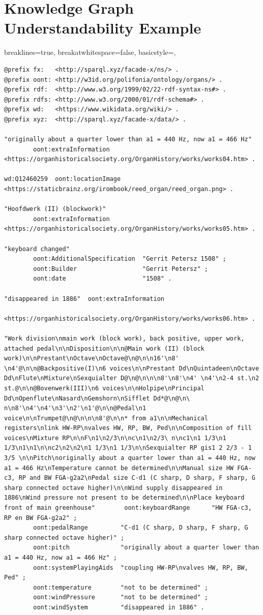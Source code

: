 \section{Knowledge Graph Understandability Example}
\lstset
{
    breaklines=true,
    breakatwhitespace=false,
    basicstyle=\linespread{1}\ttfamily,
}
\begin{lstlisting}[caption={Part01\_001MIDDE}]
@prefix fx:   <http://sparql.xyz/facade-x/ns/> .
@prefix oont: <http://w3id.org/polifonia/ontology/organs/> .
@prefix rdf:  <http://www.w3.org/1999/02/22-rdf-syntax-ns#> .
@prefix rdfs: <http://www.w3.org/2000/01/rdf-schema#> .
@prefix wd:   <https://www.wikidata.org/wiki/> .
@prefix xyz:  <http://sparql.xyz/facade-x/data/> .

"originally about a quarter lower than a1 = 440 Hz, now a1 = 466 Hz"
        oont:extraInformation  <https://organhistoricalsociety.org/OrganHistory/works/works04.htm> .

wd:Q12460259  oont:locationImage  <https://staticbrainz.org/irombook/reed_organ/reed_organ.png> .

"Hoofdwerk (II) (blockwork)"
        oont:extraInformation  <https://organhistoricalsociety.org/OrganHistory/works/works05.htm> .

"keyboard changed"
        oont:AdditionalSpecification  "Gerrit Petersz 1508" ;
        oont:Builder                  "Gerrit Petersz" ;
        oont:date                     "1508" .

"disappeared in 1886"  oont:extraInformation
                <https://organhistoricalsociety.org/OrganHistory/works/works06.htm> .

"Work division\nmain work (block work), back positive, upper work, attached pedal\n\nDisposition\n\n@Main work (II) (block work)\n\nPrestant\nOctave\nOctave@\n@\n\n16'\n8' \n4'@\n\n@Backpositive(I)\n6 voices\n\nPrestant Dd\nQuintadeen\nOctave Dd\nFlute\nMixture\nSexquialter D@\n@\n\n\n8'\n8'\n4' \n4'\n2-4 st.\n2 st.@\n\n@Bovenwerk(III)\n6 voices\n\nHolpipe\nPrincipal Dd\nOpenflute\nNasard\nGemshorn\nSifflet Dd*@\n@\n\ n\n8'\n4'\n4'\n3'\n2'\n1'@\n\n@Pedal\n1 voice\n\nTrumpet@\n@\n\n\n8'@\n\n* from a1\n\nMechanical registers\nlink HW-RP\nvalves HW, RP, BW, Ped\n\nComposition of fill voices\nMixture RP\n\nF\n1\n2/3\n\nc\n1\n2/3\ n\nc1\n1 1/3\n1 1/3\n1\n1\n\nc2\n2\n2\n1 1/3\n1 1/3\n\nSexquialter RP gis1 2 2/3 - 1 3/5 \n\nPitch\noriginally about a quarter lower than a1 = 440 Hz, now a1 = 466 Hz\nTemperature cannot be determined\n\nManual size HW FGA-c3, RP and BW FGA-g2a2\nPedal size C-d1 (C sharp, D sharp, F sharp, G sharp connected octave higher)\n\nWind supply disappeared in 1886\nWind pressure not present to be determined\n\nPlace keyboard front of main greenhouse"        oont:keyboardRange      "HW FGA-c3, RP en BW FGA-g2a2" ;
        oont:pedalRange         "C-d1 (C sharp, D sharp, F sharp, G sharp connected octave higher)" ;
        oont:pitch              "originally about a quarter lower than a1 = 440 Hz, now a1 = 466 Hz" ;
        oont:systemPlayingAids  "coupling HW-RP\nvalves HW, RP, BW, Ped" ;
        oont:temperature        "not to be determined" ;
        oont:windPressure       "not to be determined" ;
        oont:windSystem         "disappeared in 1886" .


\end{lstlisting}
